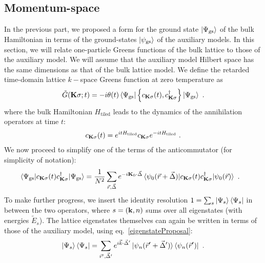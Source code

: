 \documentclass[reprint,hidelinks,onecolumn]{revtex4-2}
\begin{document}
\subsection{Momentum-space}
In the previous part, we proposed a form for the ground state \(\ket{\Psi_\text{gs}}\) of the bulk Hamiltonian in terms of the ground-states \(\ket{\psi_\text{gs}}\) of the auxiliary models.
In this section, we will relate one-particle Greens functions of the bulk lattice to those of the auxiliary model. We will assume that the auxiliary model Hilbert space has the same dimensions as that of the bulk lattice model. We define the retarded time-domain lattice \(k-\)space Greens function at zero temperature as
\begin{equation}\begin{aligned}
	\tilde G({\bf K}\sigma; t) = -i\theta(t) \braket{\Psi_\text{gs} | \left\{ c_{{\bf K}\sigma}(t), c^\dagger_{{\bf K}\sigma} \right\} | \Psi_\text{gs}}~.
\end{aligned}\end{equation}
where the bulk Hamiltonian \(H_\text{tiled}\) leads to the dynamics of the annihilation operators at time \(t\): 
\begin{equation}\begin{aligned}\label{heisenberg}
	c_{{\bf K}\sigma}(t) = e^{it H_\text{tiled} }c_{{\bf K}\sigma}e^{-i t H_\text{tiled}}~.
\end{aligned}\end{equation}
We now proceed to simplify one of the terms of the anticommutator (for simplicity of notation):
\begin{equation}\begin{aligned}\label{greensFunction1}
	&\braket{\Psi_\text{gs} | c_{{\bf K}\sigma}(t) c^\dagger_{{\bf K}\sigma} | \Psi_\text{gs}} = \frac{1}{N^2}\sum_{\vec r,\vec \Delta}e^{-i{\bf K}_0\cdot\vec\Delta}\braket{\psi_{0}(\vec r+\vec \Delta) | c_{{\bf K}\sigma}(t) c^\dagger_{{\bf K}\sigma} | \psi_{0}(\vec r)}~.
\end{aligned}\end{equation}
To make further progress, we insert the identity resolution \(1 = \sum_s\ket{\Psi_s}\bra{\Psi_s}\) in between the two operators, where \(s=\left({\bf k}, n\right)\) sums over all eigenstates (with energies \(\tilde E_s\)). The lattice eigenstates themselves can again be written in terms of those of the auxiliary model, using eq.~\ref{eigenstateProposal}:
\begin{equation}\begin{aligned}
	\ket{\Psi_s}\bra{\Psi_s} = \sum_{\vec r^\prime,\vec \Delta^\prime} e^{i\vec k\cdot\vec\Delta^\prime}\ket{\psi_n(\vec r^\prime+\vec \Delta^\prime)}\bra{\psi_n(\vec r^\prime)}~.
\end{aligned}\end{equation}
\end{document}
